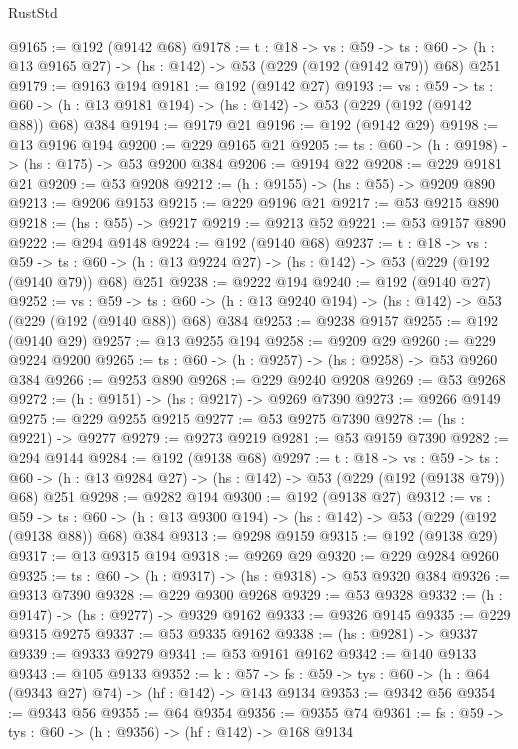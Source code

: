 \begin{lexlean}{RustStd}
\begin{coremodule}
@9165 := @192 (@9142 @68)
@9178 := {t : @18} ->
  {vs : @59} ->
  {ts : @60} -> (h : @13 @9165 @27) -> (hs : @142) -> @53 (@229 (@192 (@9142 @79)) @68) @251
@9179 := @9163 @194
@9181 := @192 (@9142 @27)
@9193 := {vs : @59} ->
  {ts : @60} -> (h : @13 @9181 @194) -> (hs : @142) -> @53 (@229 (@192 (@9142 @88)) @68) @384
@9194 := @9179 @21
@9196 := @192 (@9142 @29)
@9198 := @13 @9196 @194
@9200 := @229 @9165 @21
@9205 := {ts : @60} -> (h : @9198) -> (hs : @175) -> @53 @9200 @384
@9206 := @9194 @22
@9208 := @229 @9181 @21
@9209 := @53 @9208
@9212 := (h : @9155) -> (hs : @55) -> @9209 @890
@9213 := @9206 @9153
@9215 := @229 @9196 @21
@9217 := @53 @9215 @890
@9218 := (hs : @55) -> @9217
@9219 := @9213 @52
@9221 := @53 @9157 @890
@9222 := @294 @9148
@9224 := @192 (@9140 @68)
@9237 := {t : @18} ->
  {vs : @59} ->
  {ts : @60} -> (h : @13 @9224 @27) -> (hs : @142) -> @53 (@229 (@192 (@9140 @79)) @68) @251
@9238 := @9222 @194
@9240 := @192 (@9140 @27)
@9252 := {vs : @59} ->
  {ts : @60} -> (h : @13 @9240 @194) -> (hs : @142) -> @53 (@229 (@192 (@9140 @88)) @68) @384
@9253 := @9238 @9157
@9255 := @192 (@9140 @29)
@9257 := @13 @9255 @194
@9258 := @9209 @29
@9260 := @229 @9224 @9200
@9265 := {ts : @60} -> (h : @9257) -> (hs : @9258) -> @53 @9260 @384
@9266 := @9253 @890
@9268 := @229 @9240 @9208
@9269 := @53 @9268
@9272 := (h : @9151) -> (hs : @9217) -> @9269 @7390
@9273 := @9266 @9149
@9275 := @229 @9255 @9215
@9277 := @53 @9275 @7390
@9278 := (hs : @9221) -> @9277
@9279 := @9273 @9219
@9281 := @53 @9159 @7390
@9282 := @294 @9144
@9284 := @192 (@9138 @68)
@9297 := {t : @18} ->
  {vs : @59} ->
  {ts : @60} -> (h : @13 @9284 @27) -> (hs : @142) -> @53 (@229 (@192 (@9138 @79)) @68) @251
@9298 := @9282 @194
@9300 := @192 (@9138 @27)
@9312 := {vs : @59} ->
  {ts : @60} -> (h : @13 @9300 @194) -> (hs : @142) -> @53 (@229 (@192 (@9138 @88)) @68) @384
@9313 := @9298 @9159
@9315 := @192 (@9138 @29)
@9317 := @13 @9315 @194
@9318 := @9269 @29
@9320 := @229 @9284 @9260
@9325 := {ts : @60} -> (h : @9317) -> (hs : @9318) -> @53 @9320 @384
@9326 := @9313 @7390
@9328 := @229 @9300 @9268
@9329 := @53 @9328
@9332 := (h : @9147) -> (hs : @9277) -> @9329 @9162
@9333 := @9326 @9145
@9335 := @229 @9315 @9275
@9337 := @53 @9335 @9162
@9338 := (hs : @9281) -> @9337
@9339 := @9333 @9279
@9341 := @53 @9161 @9162
@9342 := @140 @9133
@9343 := @105 @9133
@9352 := {k : @57} ->
  {fs : @59} -> {tys : @60} -> (h : @64 (@9343 @27) @74) -> (hf : @142) -> @143 @9134
@9353 := @9342 @56
@9354 := @9343 @56
@9355 := @64 @9354
@9356 := @9355 @74
@9361 := {fs : @59} -> {tys : @60} -> (h : @9356) -> (hf : @142) -> @168 @9134

\end{coremodule}
\end{lexlean}
